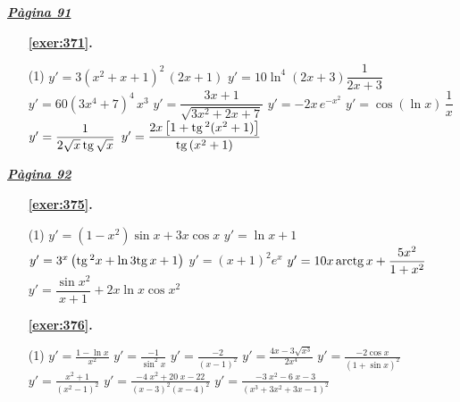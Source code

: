 \hyperlink{page.91}{\textbf{\em Pàgina 91}}
\begin{enumerate}



 \item[\fontfamily{phv}\selectfont\color{blue}\textbf{\ref{exer:371}. }] \label{ans:371}
 \begin{tasks}[column-sep=1em, item-indent=1.3333em](1)
	 \task $y'=3(x^2+x+1)^2\,(2x+1)$
	 \task* $y'=10\ln ^4 (2x+3) \dfrac {1}{2x+3}$
	 \task $y'=60(3x^4+7)^4 \,x^3$
	 \task* $y'=\dfrac {3x+1}{\sqrt {3x^2+2x+7}}$
	 \task $y'=-2x \,e^{-x^2}$
	 \task* $y'=\cos (\ln x)\,\dfrac {1}{x}$
	 \task* $y'=\dfrac {1}{2\sqrt {x}\,\mathrm{tg}\, \sqrt {x}}$
	 \task* $y'=\dfrac {2x \left [1+\mathrm{tg}\, ^2(x^2+1)\right ]}{\mathrm{tg}\, (x^2+1)}$
\end{tasks}
 \end{enumerate}
\vspace{0.3cm}


\hyperlink{page.92}{\textbf{\em Pàgina 92}}
\begin{enumerate}



 \item[\fontfamily{phv}\selectfont\color{blue}\textbf{\ref{exer:375}. }] \label{ans:375}
 \begin{tasks}[column-sep=1em, item-indent=1.3333em](1)
	 \task $y'=(1-x^2)\sin x+3x\cos x$
	 \task $y'=\ln x +1$
	 \task* $y'=3^x \left ( \mathrm{tg}\, ^2 x + \ln 3 \mathrm{tg}\, x + 1 \right )$
	 \task $y'=(x+1)^2 e^x$
	 \task* $y'=10x\,\mathrm{arctg}\, x + \dfrac {5x^2}{1+x^2}$
	 \task* $y'=\dfrac {\sin x^2}{x+1} + 2x\ln x\cos x^2$
\end{tasks}
 \end{enumerate}
\begin{enumerate}



 \item[\fontfamily{phv}\selectfont\color{blue}\textbf{\ref{exer:376}. }] \label{ans:376}
 \begin{tasks}[column-sep=1em, item-indent=1.3333em](1)
	 \task $y'=\frac {1 - \ln x }{x^2}$
	 \task $y'=\frac {-1}{\sin ^2 x}$
	 \task $y'=\frac {-2}{(x-1)^2}$
	 \task* $y'=\frac {4x-3\sqrt {x^3}}{2x^4}$
	 \task* $y'=\frac {-2\cos x}{(1+\sin x)^2}$
	 \task $y'=\frac {x^2+1}{(x^2-1)^2}$
	 \task* $y'=\frac {-4 \; x^{2} + 20 \; x - 22}{(x-3)^2 (x-4)^2}$
	 \task* $y'=\frac {-3 \; x^{2} - 6 \; x - 3}{(x^3+3x^2+3x-1)^2}$
\end{tasks}
 \end{enumerate}
\vspace{0.3cm}

